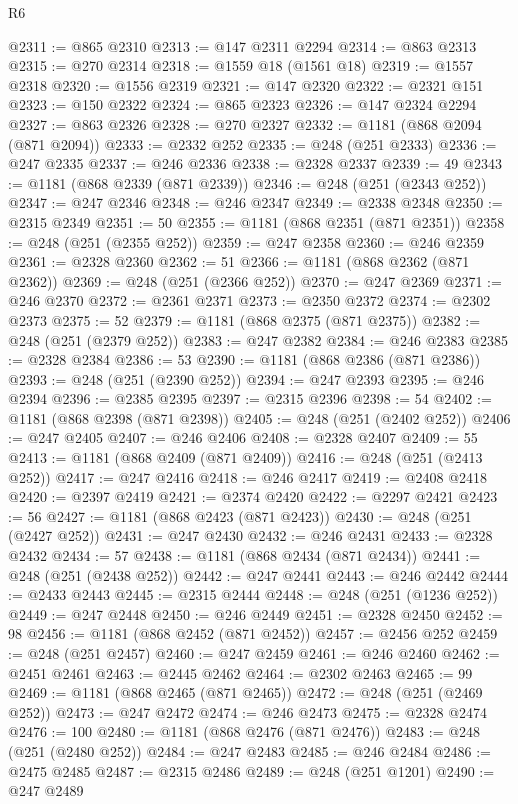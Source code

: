 \begin{lexlean}{R6}
\begin{coremodule}
@2311 := @865 @2310
@2313 := @147 @2311 @2294
@2314 := @863 @2313
@2315 := @270 @2314
@2318 := @1559 @18 (@1561 @18)
@2319 := @1557 @2318
@2320 := @1556 @2319
@2321 := @147 @2320
@2322 := @2321 @151
@2323 := @150 @2322
@2324 := @865 @2323
@2326 := @147 @2324 @2294
@2327 := @863 @2326
@2328 := @270 @2327
@2332 := @1181 (@868 @2094 (@871 @2094))
@2333 := @2332 @252
@2335 := @248 (@251 @2333)
@2336 := @247 @2335
@2337 := @246 @2336
@2338 := @2328 @2337
@2339 := 49
@2343 := @1181 (@868 @2339 (@871 @2339))
@2346 := @248 (@251 (@2343 @252))
@2347 := @247 @2346
@2348 := @246 @2347
@2349 := @2338 @2348
@2350 := @2315 @2349
@2351 := 50
@2355 := @1181 (@868 @2351 (@871 @2351))
@2358 := @248 (@251 (@2355 @252))
@2359 := @247 @2358
@2360 := @246 @2359
@2361 := @2328 @2360
@2362 := 51
@2366 := @1181 (@868 @2362 (@871 @2362))
@2369 := @248 (@251 (@2366 @252))
@2370 := @247 @2369
@2371 := @246 @2370
@2372 := @2361 @2371
@2373 := @2350 @2372
@2374 := @2302 @2373
@2375 := 52
@2379 := @1181 (@868 @2375 (@871 @2375))
@2382 := @248 (@251 (@2379 @252))
@2383 := @247 @2382
@2384 := @246 @2383
@2385 := @2328 @2384
@2386 := 53
@2390 := @1181 (@868 @2386 (@871 @2386))
@2393 := @248 (@251 (@2390 @252))
@2394 := @247 @2393
@2395 := @246 @2394
@2396 := @2385 @2395
@2397 := @2315 @2396
@2398 := 54
@2402 := @1181 (@868 @2398 (@871 @2398))
@2405 := @248 (@251 (@2402 @252))
@2406 := @247 @2405
@2407 := @246 @2406
@2408 := @2328 @2407
@2409 := 55
@2413 := @1181 (@868 @2409 (@871 @2409))
@2416 := @248 (@251 (@2413 @252))
@2417 := @247 @2416
@2418 := @246 @2417
@2419 := @2408 @2418
@2420 := @2397 @2419
@2421 := @2374 @2420
@2422 := @2297 @2421
@2423 := 56
@2427 := @1181 (@868 @2423 (@871 @2423))
@2430 := @248 (@251 (@2427 @252))
@2431 := @247 @2430
@2432 := @246 @2431
@2433 := @2328 @2432
@2434 := 57
@2438 := @1181 (@868 @2434 (@871 @2434))
@2441 := @248 (@251 (@2438 @252))
@2442 := @247 @2441
@2443 := @246 @2442
@2444 := @2433 @2443
@2445 := @2315 @2444
@2448 := @248 (@251 (@1236 @252))
@2449 := @247 @2448
@2450 := @246 @2449
@2451 := @2328 @2450
@2452 := 98
@2456 := @1181 (@868 @2452 (@871 @2452))
@2457 := @2456 @252
@2459 := @248 (@251 @2457)
@2460 := @247 @2459
@2461 := @246 @2460
@2462 := @2451 @2461
@2463 := @2445 @2462
@2464 := @2302 @2463
@2465 := 99
@2469 := @1181 (@868 @2465 (@871 @2465))
@2472 := @248 (@251 (@2469 @252))
@2473 := @247 @2472
@2474 := @246 @2473
@2475 := @2328 @2474
@2476 := 100
@2480 := @1181 (@868 @2476 (@871 @2476))
@2483 := @248 (@251 (@2480 @252))
@2484 := @247 @2483
@2485 := @246 @2484
@2486 := @2475 @2485
@2487 := @2315 @2486
@2489 := @248 (@251 @1201)
@2490 := @247 @2489

\end{coremodule}
\end{lexlean}
